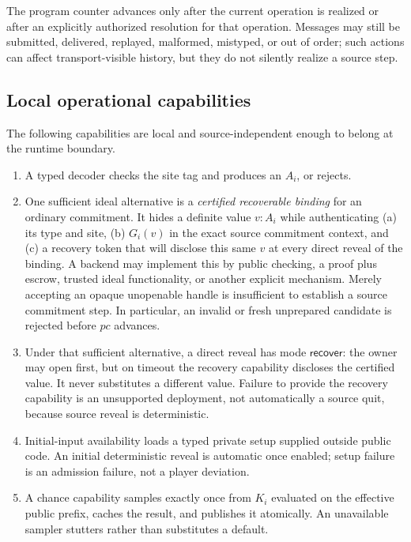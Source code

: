 \documentclass[11pt]{article}
\begin{document}
The program counter advances only after the current operation is realized or
after an explicitly authorized resolution for that operation.  Messages may
still be submitted, delivered, replayed, malformed, mistyped, or out of order;
such actions can affect transport-visible history, but they do not silently
realize a source step.

\subsection{Local operational capabilities}

The following capabilities are local and source-independent enough to belong
at the runtime boundary.

\begin{enumerate}
\item A typed decoder checks the site tag and produces an $A_i$, or rejects.
\item One sufficient ideal alternative is a \emph{certified recoverable
      binding} for an ordinary commitment.  It hides
      a definite value $v:A_i$ while authenticating (a) its type and site,
      (b) $G_i(v)$ in the exact source commitment context, and (c) a recovery
      token that will disclose this same $v$ at every direct reveal of the
      binding.  A backend may implement this by public checking, a proof plus
      escrow, trusted ideal functionality, or another explicit mechanism.
      Merely accepting an opaque unopenable handle is insufficient to establish
      a source commitment step.  In particular, an invalid or fresh
      unprepared candidate is rejected before $pc$ advances.
\item Under that sufficient alternative, a direct reveal has mode
      $\mathsf{recover}$: the owner may open first,
      but on timeout the recovery capability discloses the certified value.
      It never substitutes a different value.  Failure to provide the recovery
      capability is an unsupported deployment, not automatically a source
      quit, because source reveal is deterministic.
\item Initial-input availability loads a typed private setup supplied outside
      public code.  An initial deterministic reveal is automatic once enabled;
      setup failure is an admission failure, not a player deviation.
\item A chance capability samples exactly once from $K_i$ evaluated on the
      effective public prefix, caches the result, and publishes it atomically.
      An unavailable sampler stutters rather than substitutes a default.
\end{enumerate}
\end{document}
